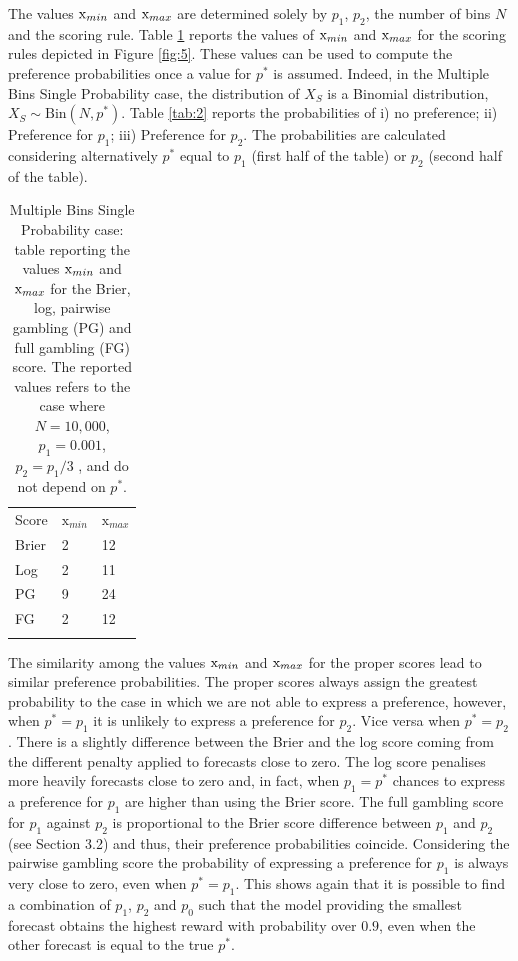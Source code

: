 \documentclass[referee,sn-basic]{sn-jnl}
\theoremstyle{thmstyleone}%
\theoremstyle{thmstyletwo}%
\theoremstyle{thmstylethree}%
\begin{document}
The values $\text x_{min}$ and $\text x_{max}$ are determined solely by $p_1$, $p_2$, the number of bins $N$ and the scoring rule. Table \ref{tab:1} reports the values of $\text x_{min}$ and $\text x_{max}$ for the scoring rules depicted in Figure \ref{fig:5}. These values can be used to compute the preference probabilities once a value for $p^*$ is assumed. Indeed, in the Multiple Bins Single Probability case, the distribution of $X_S$ is a Binomial distribution, $X_S \sim \text{Bin}(N, p^*)$. Table \ref{tab:2} reports the probabilities of i) no preference; ii) Preference for $p_1$; iii) Preference for $p_2$. The probabilities are calculated considering alternatively $p^*$ equal to $p_1$ (first half of the table) or $p_2$ (second half of the table). 

\begin{table}
\caption{Multiple Bins Single Probability case: table reporting the values $\text x_{min}$ and $\text x_{max}$ for the Brier, log, pairwise gambling (PG) and full gambling (FG) score. The reported values refers to the case where $N = 10,000$, $p_1 = 0.001$, $p_2 = p_1/3$ , and do not depend on $p^*$.}
\label{tab:1}       
\begin{tabular}{l |  l  l}
\hline\noalign{\smallskip}
Score & $\text{x}_{min}$ & $\text{x}_{max}$  \\
\noalign{\smallskip}\hline\noalign{\smallskip}
Brier & 2 & 12 \\
Log & 2 & 11 \\
PG & 9 & 24 \\
FG & 2 & 12 \\
\noalign{\smallskip}\hline
\end{tabular}
\end{table}

The similarity among the values $\text x_{min}$ and $\text x_{max}$ for the proper scores lead to similar preference probabilities. The proper scores always assign the greatest probability to the case in which we are not able to express a preference, however, when $p^* = p_1$ it is unlikely to express a preference for $p_2$. Vice versa when $p^* = p_2$. There is a slightly difference between the Brier and the log score coming from the different penalty applied to forecasts close to zero. The log score penalises more heavily forecasts close to zero and, in fact, when $p_1 = p^*$ chances to express a preference for $p_1$ are higher than using the Brier score. The full gambling score for $p_1$ against $p_2$ is proportional to the Brier score difference between $p_1$ and $p_2$ (see Section 3.2) and thus, their preference probabilities coincide. Considering the pairwise gambling score the probability of expressing a preference for $p_1$ is always very close to zero, even when $p^* = p_1$. This shows again that it is possible to find a combination of $p_1$, $p_2$ and $p_0$ such that the model providing the smallest forecast obtains the highest reward with probability over $0.9$, even when the other forecast is equal to the true $p^*$. 
\end{document}
